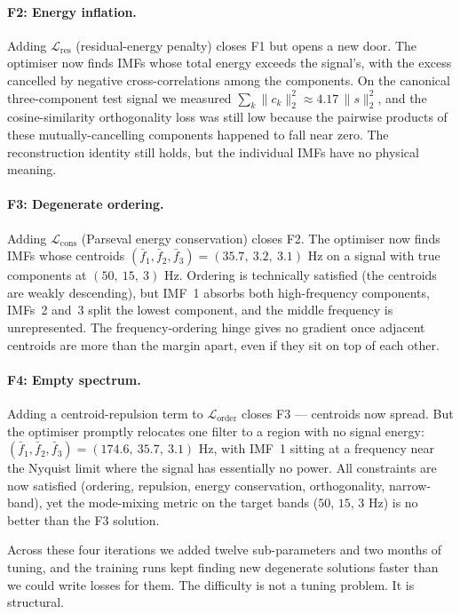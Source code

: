 \documentclass[journal]{IEEEtran}
\theoremstyle{remark}
\begin{document}
\paragraph{F2: Energy inflation.}
Adding $\mathcal{L}_{\mathrm{res}}$ (residual-energy penalty) closes
F1 but opens a new door. The optimiser now finds IMFs whose total
energy exceeds the signal's, with the excess cancelled by negative
cross-correlations among the components. On the canonical
three-component test signal we measured
$\sum_{k}\|c_{k}\|_{2}^{2} \approx 4.17\,\|s\|_{2}^{2}$, and the
cosine-similarity orthogonality loss was still low because the
pairwise products of these mutually-cancelling components happened to
fall near zero. The reconstruction identity still holds, but the
individual IMFs have no physical meaning.

\paragraph{F3: Degenerate ordering.}
Adding $\mathcal{L}_{\mathrm{cons}}$ (Parseval energy conservation)
closes F2. The optimiser now finds IMFs whose centroids
$(\bar{f}_{1}, \bar{f}_{2}, \bar{f}_{3}) = (35.7,\ 3.2,\ 3.1)$ Hz on
a signal with true components at $(50,\ 15,\ 3)$ Hz. Ordering is
technically satisfied (the centroids are weakly descending), but IMF~1
absorbs both high-frequency components, IMFs~2 and~3 split the lowest
component, and the middle frequency is unrepresented. The
frequency-ordering hinge gives no gradient once adjacent centroids are
more than the margin apart, even if they sit on top of each other.

\paragraph{F4: Empty spectrum.}
Adding a centroid-repulsion term to $\mathcal{L}_{\mathrm{order}}$
closes F3 --- centroids now spread. But the optimiser promptly relocates
one filter to a region with no signal energy:
$(\bar{f}_{1}, \bar{f}_{2}, \bar{f}_{3}) = (174.6,\ 35.7,\ 3.1)$ Hz,
with IMF~1 sitting at a frequency near the Nyquist limit where the
signal has essentially no power. All constraints are now satisfied
(ordering, repulsion, energy conservation, orthogonality,
narrow-band), yet the mode-mixing metric on the target bands
($50$, $15$, $3$ Hz) is no better than the F3 solution.

Across these four iterations we added twelve sub-parameters and two
months of tuning, and the training runs kept finding new degenerate
solutions faster than we could write losses for them. The difficulty
is not a tuning problem. It is structural.
\end{document}
